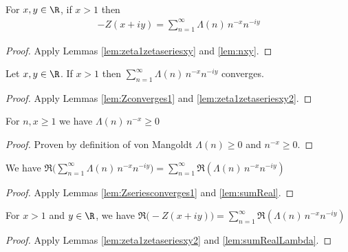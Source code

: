 \begin{lemma}\label{lem:zeta1zetaseriesxy2}  \leanok
For $x,y\in\R$, if $x>1$ then
\begin{align*}
-Z(x+iy) = \sum_{n=1}^{\infty} \Lambda(n)\,n^{-x} n^{-iy}
\end{align*}
\end{lemma}
\begin{proof} \leanok {}
Apply Lemmas \ref{lem:zeta1zetaseriesxy} and \ref{lem:nxy}.
\end{proof}

\begin{lemma}\label{lem:Zseriesconverges1}  \leanok
Let $x,y\in\R$. If $x>1$ then $\sum_{n=1}^{\infty} \Lambda(n)\,n^{-x} n^{-iy}$ converges.
\end{lemma}
\begin{proof} \leanok {}
Apply Lemmas \ref{lem:Zconverges1} and \ref{lem:zeta1zetaseriesxy2}.
\end{proof}

\begin{lemma} \label{lem:realnx}  \leanok
For $n,x\ge1$ we have $\Lambda(n)\,n^{-x}\ge0$
\end{lemma}
\begin{proof} \leanok
Proven by definition of von Mangoldt $\Lambda(n)\ge0$ and $n^{-x}\ge0$.
\end{proof}


\begin{lemma}\label{lem:sumRealLambda}  \leanok
We have $\Re\Big(\sum_{n=1}^{\infty} \Lambda(n)\,n^{-x} n^{-iy}\Big) = \sum_{n=1}^{\infty} \Re(\Lambda(n)\,n^{-x} n^{-iy})$
\end{lemma}
\begin{proof} \leanok {}
Apply Lemmas \ref{lem:Zseriesconverges1} and \ref{lem:sumReal}.
\end{proof}

\begin{lemma} \label{lem:sumRealZ}  \leanok
For $x>1$ and $y\in\R$, we have $\Re\big(-Z(x+iy)\big) = \sum_{n=1}^{\infty} \Re(\Lambda(n)\,n^{-x} n^{-iy})$
\end{lemma}
\begin{proof} \leanok {}
Apply Lemmas \ref{lem:zeta1zetaseriesxy2} and \ref{lem:sumRealLambda}.
\end{proof}

